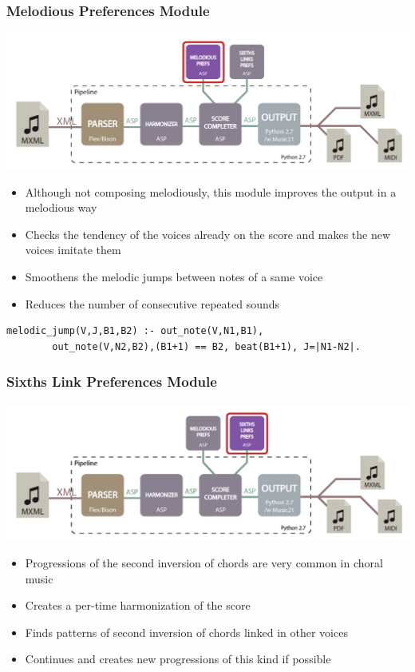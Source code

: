 \documentclass[english,handout]{beamer}
\begin{document}
	\begin{frame}[t,fragile]
	\frametitle{Melodious Preferences Module}
	\begin{center}
			\includegraphics[width=0.6\linewidth]{imagenes/arch_trans/arquitectura_final_asp_pref_mel-01.png}
			\end{center}
	\begin{itemize}
		\item Although not composing melodiously, this module \alert{improves the output in a melodious way}
		\pause
		\item \alert{Checks the tendency} of the voices already on the score and makes the new voices imitate them
		\pause
		\item \alert{Smoothens the melodic jumps} between notes of a same voice
		\item Reduces the number of \alert{consecutive repeated sounds}
	\end{itemize}
		\begin{Verbatim}[frame=single]
		melodic_jump(V,J,B1,B2) :- out_note(V,N1,B1),
		out_note(V,N2,B2),(B1+1) == B2, beat(B1+1), J=|N1-N2|.
		\end{Verbatim}
	\end{frame}
	\begin{frame}[t,fragile]
	\frametitle{Sixths Link Preferences Module}
	\begin{center}
			\includegraphics[width=0.6\linewidth]{imagenes/arch_trans/arquitectura_final_asp_pref_six.png}
			\end{center}
	\begin{itemize}
		\item Progressions of the \alert{second inversion of chords} are very common in choral music
		\item Creates a \alert{per-time harmonization} of the score
		\item \alert{Finds patterns} of second inversion of chords linked in other voices
		\item \alert{Continues and creates} new progressions of this kind if possible
	\end{itemize}
	\end{frame}
\end{document}
